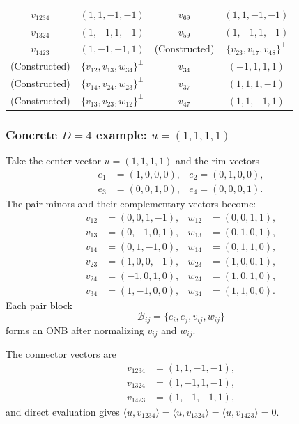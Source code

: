 \documentclass[%
  reprint,
  superscriptaddress,
  showpacs,
  showkeys,
  amsmath,amssymb,
  pra,
  longbibliography,
  floatfix,
  x11names
]{revtex4-2}
\newcommand{\rev}[1]{{\color{revisionblue}#1}}
\begin{document}
\begin{table}[ht]
\begin{ruledtabular}
\begin{tabular}{cccc}
\hline
$v_{1234}$ & $(1,1,-1,-1)$ & $v_{69}$ & $(1,1,-1,-1)$ \\
$v_{1324}$ & $(1,-1,1,-1)$ & $v_{59}$ & $(1,-1,1,-1)$ \\
$v_{1423}$ & $(1,-1,-1,1)$ & \rev{(Constructed)} & \rev{$\{v_{23},v_{17},v_{48}\}^\perp$} \\
\hline
(Constructed) & $\{v_{12}, v_{13}, w_{34}\}^\perp$ & $v_{34}$ & $(-1,1,1,1)$ \\
(Constructed) & $\{v_{14}, v_{24}, w_{23}\}^\perp$ & $v_{37}$ & $(1,1,1,-1)$ \\
\rev{(Constructed)} & \rev{$\{v_{13},v_{23},w_{12}\}^\perp$} & \rev{$v_{47}$} & \rev{$(1,1,-1,1)$} \\
\end{tabular}
\end{ruledtabular}
\end{table}





\subsubsection{Concrete $D=4$ example: $u=(1,1,1,1)$}

Take the center vector $u=(1,1,1,1)$ and the rim vectors
\begin{align*}
e_1&=(1,0,0,0),& e_2 =(0,1,0,0),\\
e_3&=(0,0,1,0),& e_4 =(0,0,0,1).
\end{align*}
The pair minors and their complementary vectors become:
\begin{align*}
v_{12}&=(0,0,1,-1), & w_{12}&=(0,0,1,1),\\
v_{13}&=(0,-1,0,1), & w_{13}&=(0,1,0,1),\\
v_{14}&=(0,1,-1,0), & w_{14}&=(0,1,1,0),\\
v_{23}&=(1,0,0,-1), & w_{23}&=(1,0,0,1),\\
v_{24}&=(-1,0,1,0), & w_{24}&=(1,0,1,0),\\
v_{34}&=(1,-1,0,0), & w_{34}&=(1,1,0,0).
\end{align*}
Each pair block
\[
\mathcal{B}_{ij}=\{e_i, e_j, v_{ij}, w_{ij}\}
\]
forms an ONB after normalizing $v_{ij}$ and $w_{ij}$.

The connector vectors are
\begin{align*}
v_{1234}&=(1,1,-1,-1),\\
v_{1324}& =(1,-1,1,-1),\\
v_{1423}&=(1,-1,-1,1),
\end{align*}
\rev{and direct evaluation gives $\langle u,v_{1234}\rangle=\langle u,v_{1324}\rangle=\langle u,v_{1423}\rangle=0$.}
\end{document}
